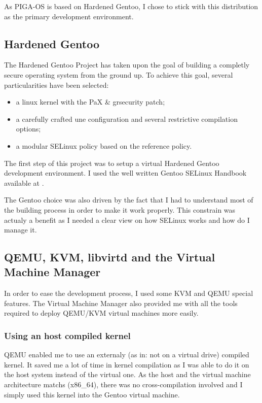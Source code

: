 \documentclass[pdftex,a4paper,titlepage,11pt]{article}
\begin{document}
\smallskip

As PIGA-OS is based on Hardened Gentoo, I chose to stick with this distribution
as the primary development environment.

\subsection{Hardened Gentoo}

The Hardened Gentoo Project has taken upon the goal of building a completly
secure operating system from the ground up. To achieve this goal, several
particularities have been selected:
\begin{itemize}
	\item a linux kernel with the PaX \& grsecurity patch;
	\item a carefully crafted une configuration and several restrictive
compilation options;
	\item a modular SELinux policy based on the reference policy.
\end{itemize}

\smallskip

The first step of this project was to setup a virtual Hardened Gentoo
development environment. I used the well written Gentoo SELinux Handbook
available at \cite{gentooselinuxhandbook}.

\bigskip

The Gentoo choice was also driven by the fact that I had to understand most of
the building process in order to make it work properly. This constrain was
actualy a benefit as I needed a clear view on how SELinux works and how do I
manage it.

\subsection{QEMU, KVM, libvirtd and the Virtual Machine Manager}

In order to ease the development process, I used some KVM and QEMU special
features. The Virtual Machine Manager also provided me with all the tools
required to deploy QEMU/KVM virtual machines more easily.

\subsubsection{Using an host compiled kernel}

QEMU enabled me to use an externaly (as in: not on a virtual drive) compiled
kernel. It saved me a lot of time in kernel compilation as I was able to do it
on the host system instead of the virtual one. As the host and the virtual
machine architecture matchs (x86\_64), there was no cross-compilation involved
and I simply used this kernel into the Gentoo virtual machine.
\end{document}
